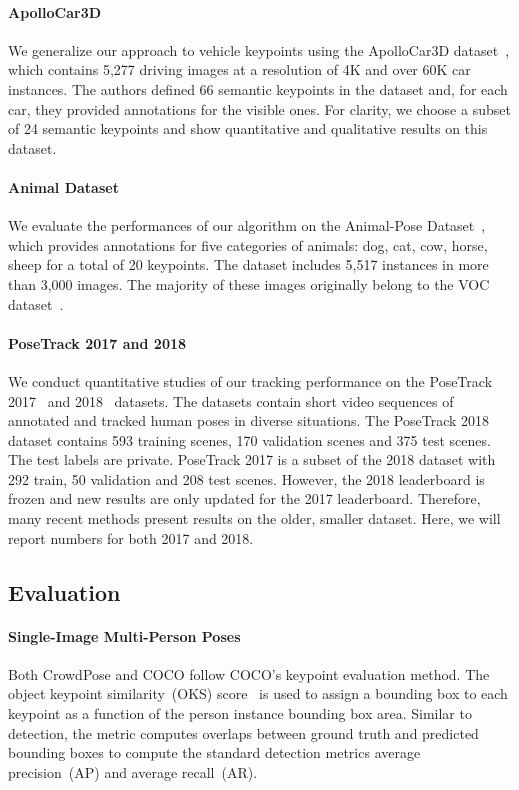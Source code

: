 \documentclass[journal]{IEEEtran}
\begin{document}
\paragraph{ApolloCar3D}
We generalize our approach to vehicle keypoints using the ApolloCar3D
dataset~\cite{song2019apollocar3d}, which contains 5,277 driving images at a
resolution of 4K and over 60K car instances. The authors defined 66 semantic
keypoints in the dataset and, for each car, they provided annotations for the
visible ones. For clarity, we choose a subset of 24 semantic
keypoints and show quantitative and qualitative results on this dataset.

\paragraph{Animal Dataset}
We evaluate the performances of our algorithm on the Animal-Pose
Dataset~\cite{cao2019cross}, which provides annotations for five categories of
animals: dog, cat, cow, horse, sheep for a total of 20 keypoints. The dataset
includes 5,517 instances in more than 3,000 images. The majority of these
images originally belong to the VOC dataset~\cite{everingham2015pascal}.

\paragraph{PoseTrack 2017 and 2018}
We conduct quantitative studies of our tracking performance on the
PoseTrack 2017~\cite{iqbal2017posetrack} and 2018~\cite{andriluka2018posetrack} datasets.
The datasets contain short video sequences of annotated and tracked human poses
in diverse situations. The PoseTrack 2018 dataset contains 593 training scenes,
170 validation scenes
and 375 test scenes. The test labels are private.
PoseTrack 2017 is a subset of the 2018 dataset with 292 train, 50 validation and
208 test scenes. However, the 2018 leaderboard is
frozen and new results are only updated for the 2017 leaderboard. Therefore, many
recent methods present results on the older, smaller dataset. Here, we will report
numbers for both 2017 and 2018.


\subsection{Evaluation}

\paragraph{Single-Image Multi-Person Poses}
Both CrowdPose and COCO follow COCO's keypoint evaluation method.
The object keypoint similarity~(OKS) score~\cite{lin2014microsoft} is used
to assign a bounding box to each keypoint as a function of the person instance
bounding box area. Similar to detection, the metric computes overlaps between ground truth
and predicted bounding boxes to compute the standard detection metrics
average precision~(AP) and average recall~(AR).
\end{document}
